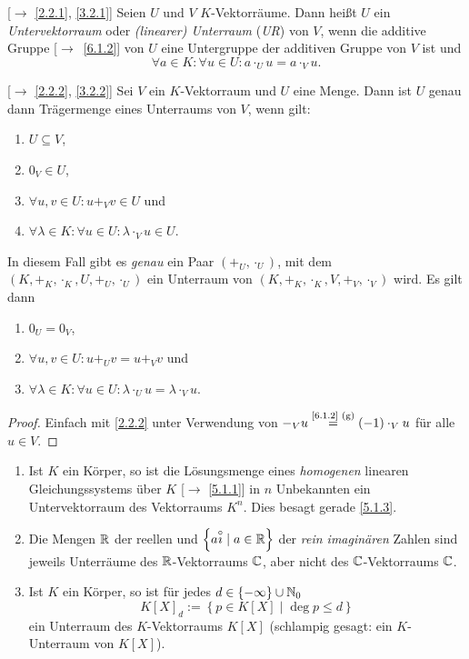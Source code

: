 \documentclass[../../main.tex]{subfiles}
\begin{document}

\begin{df}\mbox{}\label{6.1.9}
[$\to$ \ref{2.2.1}, \ref{3.2.1}] Seien $U$ und $V$ $K$-Vektorräume. Dann heißt $U$ ein \emph{Untervektorraum} oder \emph{(linearer) Unterraum} (\emph{UR}) von $V$, wenn die additive Gruppe [$\to$~\ref{6.1.2}] von $U$ eine Untergruppe der additiven Gruppe von $V$ ist und
\[\forall a\in K:\forall u\in U: a\cdot_U u = a\cdot_V u.\]
\end{df}

\begin{pro}\label{6.1.10}
{\rm[$\to$ \ref{2.2.2}, \ref{3.2.2}]} Sei $V$ ein $K$-Vektorraum und $U$ eine Menge. Dann ist $U$ genau dann Trägermenge eines Unterraums von $V$, wenn gilt:
\begin{enumerate}[\rm(a)]
\item $U\subseteq V$,
\item $0_V\in U$,
\item $\forall u,v\in U: u +_V v \in U$ und
\item $\forall \lambda\in K:\forall u\in U:\lambda \cdot_V u \in U$.
\end{enumerate}
In diesem Fall gibt es \emph{genau} ein Paar $(+_U,\cdot_U)$, mit dem $(K,+_K,\cdot_K,U,+_U,\cdot_U)$ ein Unterraum von $(K,+_K,\cdot_K, V, +_V,\cdot_V)$ wird. Es gilt dann
\begin{enumerate}[\rm(a')]
\item $0_U = 0_V$,
\item $\forall u,v\in U:u+_U v = u+_V v$ und
\item $\forall \lambda\in K:\forall u\in U:\lambda\cdot_Uu= \lambda\cdot_Vu$.
\end{enumerate}
\end{pro}
\begin{proof}
Einfach mit \ref{2.2.2} unter Verwendung von $-_V u\overset{\text{\ref{6.1.2} (g)}}{=} (-1)\cdot_V u$ für alle $u\in V$.
\end{proof}

\begin{bsp}\label{6.1.11}
\begin{enumerate}[\normalfont(a)]
\item Ist $K$ ein Körper, so ist die Lösungsmenge eines \emph{homogenen} linearen Gleichungssystems über $K$ [$\to$ \ref{5.1.1}] in $n$ Unbekannten ein Untervektorraum des Vektorraums $K^n$. Dies besagt gerade \ref{5.1.3}.
\item Die Mengen $\mathbb R$ der reellen und $\left\{a\overset\circ\imath\mid a\in\mathbb R\right\}$ der \emph{rein imaginären} Zahlen sind jeweils Unterräume des $\mathbb R$-Vektorraums $\mathbb C$, aber nicht des $\mathbb C$-Vektorraums $\mathbb C$.
\item Ist $K$ ein Körper, so ist für jedes $d\in\left\{-\infty\right\}\cup \mathbb N_0$
\[K[X]_d := \left\{p\in K[X]\mid\deg p\le d\right\}\]
ein Unterraum des $K$-Vektorraums $K[X]$ (schlampig gesagt: ein $K$-Unterraum von $K[X]$).
\end{enumerate}
\end{bsp}
\end{document}
